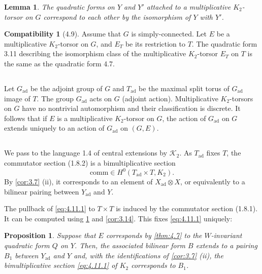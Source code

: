 \documentclass[11pt,a4paper]{article}
\theoremstyle{plain}
\newtheorem{lemma}[theorem]{Lemma}
\newtheorem{proposition}[theorem]{Proposition}
\theoremstyle{definition}
\newtheorem{compatibility}[theorem]{Compatibility}
\newcommand{\cK}{\mathcal{K}}
\newcommand{\ad}{\mathrm{ad}}
\begin{document}
\begin{lemma}\label{lem:4.8.6}
The quadratic forms on $Y$ and $Y'$ attached to a multiplicative $K_2$-torsor on $G$ correspond to each other by the isomorphism of $Y$ with $Y'$.
\end{lemma}

\begin{compatibility}[4.9]\label{comp:4.9}
Assume that $G$ is simply-connected. Let $E$ be a multiplicative $K_2$-torsor on $G$, and $E_T$ be its restriction to $T$. The quadratic form 3.11 describing the isomorphism class of the multiplicative $K_2$-torsor $E_T$ on $T$ is the same as the quadratic form 4.7.
\end{compatibility}

\subsection{}
Let $G_\ad$ be the adjoint group of $G$ and $T_\ad$ be the maximal split torus of $G_\ad$ image of $T$. The group $G_\ad$ acts on $G$ (adjoint action). Multiplicative $K_2$-torsors on $G$ have no nontrivial automorphism and their classification is discrete. It follows that if $E$ is a multiplicative $K_2$-torsor on $G$, the action of $G_\ad$ on $G$ extends uniquely to an action of $G_\ad$ on $(G, E)$.

\subsection{}
We pass to the language 1.4 of central extensions by $\cK_2$. As $T_\ad$ fixes $T$, the commutator section (1.8.2) is a bimultiplicative section
\begin{equation}\label{eq:4.11.1}
\mathrm{comm} \in H^0(T_\ad \times T, K_2).
\end{equation}
By \ref{cor:3.7} (ii), it corresponds to an element of $X_\ad \otimes X$, or equivalently to a bilinear pairing between $Y_\ad$ and $Y$.

The pullback of \eqref{eq:4.11.1} to $T \times T$ is induced by the commutator section (1.8.1). It can be computed using \ref{comp:4.9} and \ref{cor:3.14}. This fixes \eqref{eq:4.11.1} uniquely:

\begin{proposition}\label{prop:4.12}
Suppose that $E$ corresponds by \ref{thm:4.7} to the $W$-invariant quadratic form $Q$ on $Y$. Then, the associated bilinear form $B$ extends to a pairing $B_1$ between $Y_\ad$ and $Y$ and, with the identifications of \ref{cor:3.7} \textup{(ii)}, the bimultiplicative section \eqref{eq:4.11.1} of $K_2$ corresponds to $B_1$.
\end{proposition}
\end{document}
